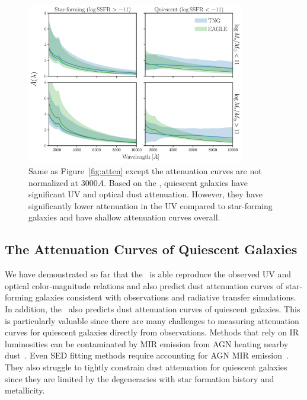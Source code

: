 \begin{figure}
\begin{center}
    \includegraphics[width=0.85\textwidth]{figs/abc_attenuation_unormalized.pdf}
    \caption{\label{fig:raw_atten}
    Same as Figure~\ref{fig:atten} except the attenuation curves are not
    normalized at 3000$A$. Based on the \eda, quiescent galaxies have
    significant UV and optical dust attenuation. However, they have 
    significantly lower attenuation in the UV compared to star-forming 
    galaxies and have shallow attenuation curves overall.
    }
\end{center}
\end{figure}
\subsection{The Attenuation Curves of Quiescent Galaxies}  
We have demonstrated so far that the \eda~is able reproduce the observed UV and
optical color-magnitude relations and also predict dust attenuation curves
of star-forming galaxies consistent with observations and radiative transfer 
simulations. In addition, the \eda~also predicts dust attenuation curves of
quiescent galaxies. This is particularly valuable since there are many challenges 
to measuring attenuation curves for quiescent galaxies directly from observations. 
Methods that rely on IR luminosities can be contaminated by MIR emission from AGN
heating nearby dust~\citep{kirkpatrick2015}. Even SED fitting methods require 
accounting for AGN MIR emission~\citep{salim2016, leja2018, salim2018}. They
also struggle to tightly constrain dust attenuation for quiescent 
galaxies since they are limited by the degeneracies with star formation history and 
metallicity.

